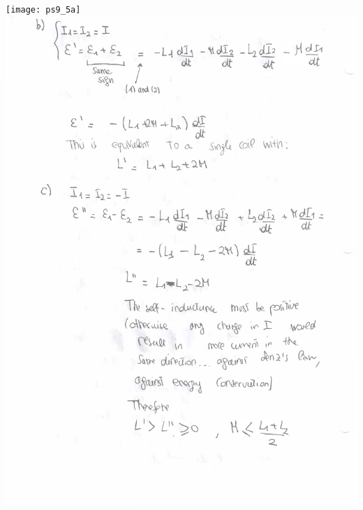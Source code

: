 \documentclass[makesolutionspdf]{esg8022pset}
\begin{document}
\begin{solution}
  \begin{center}
    \texttt{[image: ps9\_5a]}
    \clearpage
    \includegraphics[width = \textwidth, height = 0.9\textheight, keepaspectratio]{ps9_5b}
  \end{center}
\end{solution}
\end{document}
